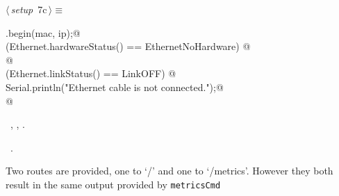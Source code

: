 \documentclass[a4paper, 11pt]{article}
\begin{document}
\begin{flushleft} \small
\begin{minipage}{\linewidth}\label{scrap9}\raggedright\small
{}$\langle\,${\itshape setup}\nobreak\ {\footnotesize{7c}}$\,\rangle\equiv$
\vspace{-1ex}
\begin{list}{}{\setlength{\leftmargin}{1em}} \item
\mbox{}\lstinline@Ethernet.begin(mac, ip);@\\
\mbox{}\lstinline@if (Ethernet.hardwareStatus() == EthernetNoHardware) @\\
\mbox{}@\\
\mbox{}\lstinline@if (Ethernet.linkStatus() == LinkOFF) {@\\
\mbox{}\lstinline@  Serial.println("Ethernet cable is not connected.");@\\
\mbox{}\lstinline@}@\\
\mbox{}{\NWsep}
\end{list}
\vspace{-1ex}
\vspace{-1ex}
\footnotesize
\begin{list}{}{\setlength{\itemsep}{-\parsep}\setlength{\itemindent}{-\leftmargin}}
\item \NWtxtMacroDefBy\ , , .
\item \NWtxtMacroRefIn\ .
\end{list}
\end{minipage}
\end{flushleft}

Two routes are provided,
one to `/' and one to `/metrics'.
However they both result in the same output provided by \verb|metricsCmd|
\end{document}
